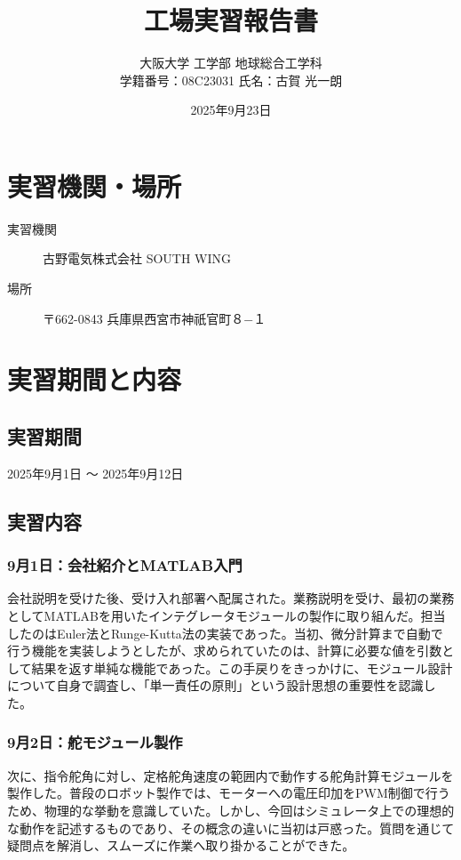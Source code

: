 \documentclass[a4j,11pt]{jsarticle}
\title{工場実習報告書}
\author{
    大阪大学 工学部 地球総合工学科 \\
    学籍番号：08C23031 \quad 氏名：古賀 光一朗
}
\date{2025年9月23日} %
\begin{document}
\maketitle
\tableofcontents
\clearpage

\section{実習機関・場所}
\label{sec:location}
\begin{description}
    \item[実習機関] 古野電気株式会社 SOUTH WING
    \item[場所] 〒662-0843 兵庫県西宮市神祇官町８−１
\end{description}

\section{実習期間と内容}
\label{sec:period_content}
\subsection{実習期間}
2025年9月1日 ～ 2025年9月12日

\subsection{実習内容}
\subsubsection{9月1日：会社紹介とMATLAB入門}
会社説明を受けた後、受け入れ部署へ配属された。業務説明を受け、最初の業務としてMATLABを用いたインテグレータモジュールの製作に取り組んだ。担当したのはEuler法とRunge-Kutta法の実装であった。当初、微分計算まで自動で行う機能を実装しようとしたが、求められていたのは、計算に必要な値を引数として結果を返す単純な機能であった。この手戻りをきっかけに、モジュール設計について自身で調査し、「単一責任の原則」という設計思想の重要性を認識した。

\subsubsection{9月2日：舵モジュール製作}
次に、指令舵角に対し、定格舵角速度の範囲内で動作する舵角計算モジュールを製作した。普段のロボット製作では、モーターへの電圧印加をPWM制御で行うため、物理的な挙動を意識していた。しかし、今回はシミュレータ上での理想的な動作を記述するものであり、その概念の違いに当初は戸惑った。質問を通じて疑問点を解消し、スムーズに作業へ取り掛かることができた。
\end{document}
